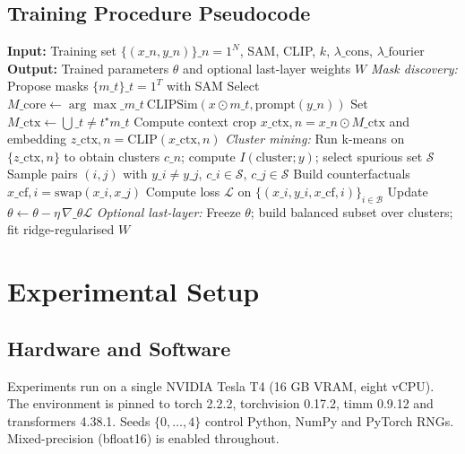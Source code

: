 \documentclass{article}
\begin{document}
\subsection{Training Procedure Pseudocode}
\begin{algorithm}
\caption{AutoSpuSwap training}
\begin{algorithmic}[1]
  \State \textbf{Input:} Training set \(\{(x\_n,y\_n)\}\_{n=1}^N\), SAM, CLIP, \(k\), \(\lambda\_{\text{cons}}\), \(\lambda\_{\text{fourier}}\)
  \State \textbf{Output:} Trained parameters \(\theta\) and optional last-layer weights \(W\)
  \State \textit{Mask discovery:}
    \State Propose masks \(\{m\_t\}\_{t=1}^{T}\) with SAM
    \State Select \(M\_{\text{core}} \leftarrow \arg\max\limits\_{m\_t}\ \text{CLIPSim}(x \odot m\_t, \text{prompt}(y\_n))\)
    \State Set \(M\_{\text{ctx}} \leftarrow \bigcup\_{t\ne t^{\star}} m\_t\)
    \State Compute context crop \(x\_{\text{ctx},n} = x\_n \odot M\_{\text{ctx}}\) and embedding \(z\_{\text{ctx},n} = \text{CLIP}(x\_{\text{ctx},n})\)
  \EndFor
  \State \textit{Cluster mining:} Run k-means on \(\{z\_{\text{ctx},n}\}\) to obtain clusters \(c\_n\); compute \(I(\text{cluster};y)\); select spurious set \(\mathcal{S}\)
      \State Sample pairs \((i,j)\) with \(y\_i\ne y\_j\), \(c\_i\in \mathcal{S}\), \(c\_j\in \mathcal{S}\)
      \State Build counterfactuals \(x\_{\text{cf},i} = \mathrm{swap}(x\_i,x\_j)\)
      \State Compute loss \(\mathcal{L}\) on \(\{(x\_i,y\_i,x\_{\text{cf},i})\}_{i\in\mathcal{B}}\)
      \State Update \(\theta \leftarrow \theta - \eta\, \nabla\_{\theta} \mathcal{L}\)
    \EndFor
  \EndFor
  \State \textit{Optional last-layer:} Freeze \(\theta\); build balanced subset over clusters; fit ridge-regularised \(W\)
\end{algorithmic}
\end{algorithm}

\section{Experimental Setup}
\subsection{Hardware and Software}
Experiments run on a single NVIDIA Tesla T4 (16 GB VRAM, eight vCPU). The environment is pinned to torch 2.2.2, torchvision 0.17.2, timm 0.9.12 and transformers 4.38.1. Seeds \(\{0,\dots,4\}\) control Python, NumPy and PyTorch RNGs. Mixed-precision (bfloat16) is enabled throughout.
\end{document}
